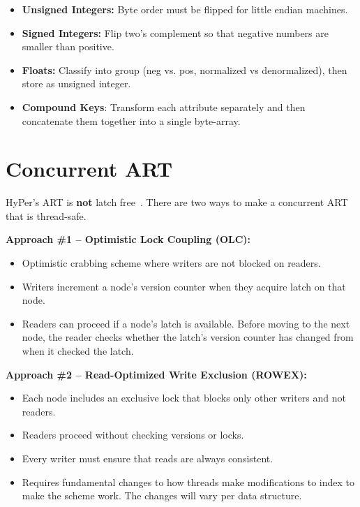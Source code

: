 \documentclass[11pt]{article}
\begin{document}
\begin{itemize}
    \item \textbf{Unsigned Integers:}
    Byte order must be flipped for little endian machines.
    
    \item \textbf{Signed Integers:}
    Flip two's complement so that negative numbers are smaller than positive.
    
    \item \textbf{Floats:}
    Classify into group (neg vs. pos, normalized vs denormalized), then store 
    as unsigned integer.
    
    \item \textbf{Compound Keys}:
    Transform each attribute separately and then concatenate them together into a single byte-array.
\end{itemize}

\section{Concurrent ART}
HyPer's ART is \textbf{not} latch free~\cite{leis-damon2016}. There are two ways to make a 
concurrent ART that is thread-safe.

\textbf{Approach \#1 -- Optimistic Lock Coupling (OLC):}
\begin{itemize}
    \item
    Optimistic crabbing scheme where writers are not blocked on readers.
    
    \item
    Writers increment a node's version counter when they acquire latch on that node.
    
    \item
    Readers can proceed if a node's latch is available.
    Before moving to the next node, the reader checks whether the latch's version counter 
    has changed from when it checked the latch.
\end{itemize}
    
\textbf{Approach \#2 -- Read-Optimized Write Exclusion (ROWEX):}
\begin{itemize}
    \item
    Each node includes an exclusive lock that blocks only other writers and not readers.
    
    \item
    Readers proceed without checking versions or locks.
    
    \item
    Every writer must ensure that reads are always consistent.
    
    \item
    Requires fundamental changes to how threads make modifications to index to 
    make the scheme work. The changes will vary per data structure.
\end{itemize}
\end{document}
